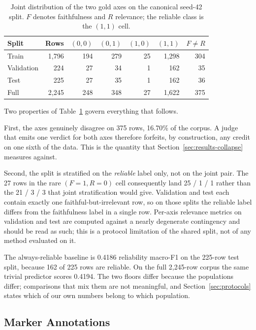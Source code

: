 \documentclass{zapiski}
\begin{document}
\begin{table}[H]
\centering
\caption{Joint distribution of the two gold axes on the canonical seed-42
split. $F$ denotes faithfulness and $R$ relevance; the reliable class is the
$(1,1)$ cell.}
\label{tab:joint-labels}
\begin{tabular}{lrrrrrr}
\toprule
Split & Rows & $(0,0)$ & $(0,1)$ & $(1,0)$ & $(1,1)$ & $F \neq R$ \\
\midrule
Train      & 1,796 & 194 & 279 & 25 & 1,298 & 304 \\
Validation &   224 &  27 &  34 &  1 &   162 &  35 \\
Test       &   225 &  27 &  35 &  1 &   162 &  36 \\
\midrule
Full       & 2,245 & 248 & 348 & 27 & 1,622 & 375 \\
\bottomrule
\end{tabular}
\end{table}

Two properties of Table~\ref{tab:joint-labels} govern everything that follows.

First, the axes genuinely disagree on 375 rows, 16.70\% of the corpus. A judge
that emits one verdict for both axes therefore forfeits, by construction, any
credit on one sixth of the data. This is the quantity that
Section~\ref{sec:results-collapse} measures against.

Second, the split is stratified on the \emph{reliable} label only, not on the
joint pair. The 27 rows in the rare $(F{=}1, R{=}0)$ cell consequently land
25 / 1 / 1 rather than the 21 / 3 / 3 that joint stratification would give.
Validation and test each contain exactly one faithful-but-irrelevant row, so
on those splits the reliable label differs from the faithfulness label in a
single row. Per-axis relevance metrics on validation and test are computed
against a nearly degenerate contingency and should be read as such; this is a
protocol limitation of the shared split, not of any method evaluated on it.

The always-reliable baseline is 0.4186 reliability macro-F1 on the 225-row
test split, because 162 of 225 rows are reliable. On the full 2,245-row corpus
the same trivial predictor scores 0.4194. The two floors differ because the
populations differ; comparisons that mix them are not meaningful, and
Section~\ref{sec:protocols} states which of our own numbers belong to which
population.

\subsection{Marker Annotations}
\label{sec:data-markers}
\end{document}
